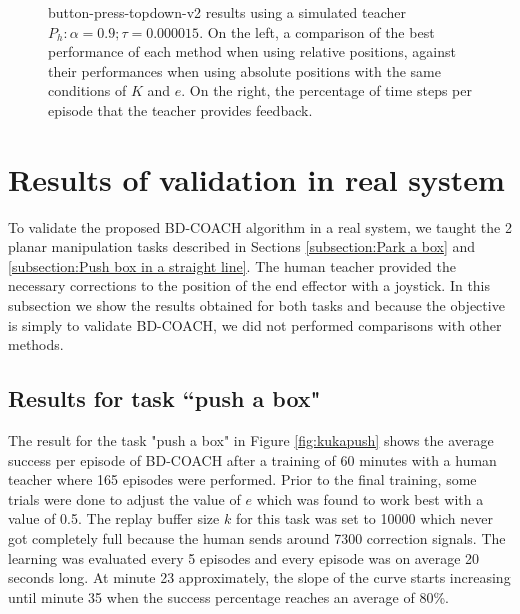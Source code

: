  \begin{figure}[H]
  \centering
   \hfill
   \caption{button-press-topdown-v2 results using a simulated teacher $P_h: \alpha = 0.9; \tau =  0.000015$. On the left, a comparison of the best performance of each method when using relative positions, against their performances when using absolute positions with the same conditions of $K$ and $e$. On the right, the percentage of time steps per episode that the teacher  provides feedback.}
  \label{fig:resultsbutton-press-topdown-v2-best}
\end{figure}



\section{Results of validation in real system}
\label{section:results_kuka}

To validate the proposed BD-COACH algorithm in a real system, we taught the 2 planar manipulation tasks described in Sections \ref{subsection:Park a box} and \ref{subsection:Push box in a straight line}. The human teacher provided the necessary corrections to the position of the end effector with a joystick. In this subsection we show the results obtained for both tasks and because the objective is simply to validate BD-COACH, we did not performed comparisons with other methods. 


\subsection{Results for task ``push a box"}
\label{subsection:results_kuka_push}
The result for the task "push a box" in Figure \ref{fig:kukapush} shows the average success per episode of BD-COACH after a training of 60 minutes with a human teacher where 165 episodes were performed. Prior to the final training, some trials were done to adjust the value of $e$ which was found to work best with a value of 0.5. The replay buffer size $k$ for this task was set to 10000 which never got completely full because the human sends around 7300 correction signals.
The learning was evaluated every 5 episodes and every episode was on average 20 seconds long. At minute 23 approximately, the slope of the curve starts increasing until minute 35 when the success percentage reaches an average of 80\%.











